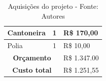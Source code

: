 \begin{table}[H]
\begin{tabular}{|l|c|l|}
Cantoneira                                                     & 1                 & R\$ 170,00                             \\ \hline
Polia                                                               & 1                 & R\$ 10,00                              \\ \hline
\multicolumn{2}{|c|}{\textbf{Orçamento}}                      & R\$ 1.347.00                         \\ \hline
\multicolumn{2}{|c|}{\textbf{Custo total}}                      & R\$ 1.251,55                          \\ \hline
\end{tabular}
\caption{Aquisições do projeto - Fonte: Autores}
\label{tab:acompanhamento_custos}
\end{table}

